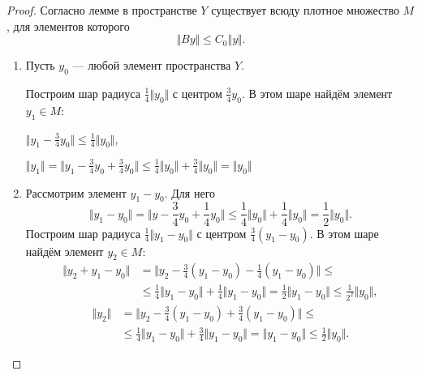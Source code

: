 \documentclass[12pt,a4paper,titlepage,oneside]{book}
\theoremstyle{definition}
\theoremstyle{plain}
\theoremstyle{break}
\theoremstyle{remark}
\theoremstyle{remark}
\theoremstyle{remark}
\theoremstyle{remark}
\theoremstyle{plain}
\theoremstyle{plain}
\begin{document}
\begin{proof}
Согласно лемме в пространстве $Y$ существует всюду плотное множество $M$, для элементов которого
$$\Vert By \Vert \leqslant C_0 \Vert y \Vert.$$
\begin{enumerate}

	\item Пусть $y_0$ --- любой элемент пространства $Y$.
	
	Построим шар радиуса $\frac{1}{4}\Vert y_0 \Vert$ с 		центром $\frac{3}{4}y_0$. В этом шаре найдём элемент
	$y_1 \in M$:
	\begin{center}
	$\Vert y_1 - \frac{3}{4}y_0\Vert \leqslant \frac{1}{4}    		\Vert y_0 \Vert $,
	\end{center}
	\begin{center}
	$\Vert y_1 \Vert =
	\Vert y_1 - \frac{3}{4}y_0 +
	\frac{3}{4}y_0 \Vert \leqslant \frac{1}{4} 			\Vert y_0 \Vert +
	 \frac{3}{4}\Vert y_0\Vert = 				\Vert y_0 \Vert$
	\end{center}
	
	\item Рассмотрим элемент $y_1 - y_0$. Для него
	$$\Vert y_1-y_0 \Vert =\Vert y - \frac{3}{4}y_0 +
	\frac{1}{4}y_0 \Vert \leqslant
	\frac{1}{4} \Vert y_0 \Vert +
	\frac{1}{4} \Vert y_0 \Vert =
	\frac{1}{2} \Vert y_0 \Vert.$$
	Построим шар радиуса $\frac{1}{4} \Vert 		y_1 - y_0 \Vert$ с центром $\frac{3}{4} (y_1 - y_0)$. В этом шаре найдём элемент $y_2 \in M$:
	\begin{align*}
	\Vert y_2 + y_1 - y_0 \Vert &= \Vert y_2 - \frac{3}{4}(y_1 - y_0) -
	\frac{1}{4}(y_1 - y_0) \Vert \leqslant \\
	&\leqslant \frac{1}{4} \Vert y_1 - y_0 \Vert + \frac{1}{4} \Vert y_1 - y_0 \Vert = \frac{1}{2} \Vert y_1 - y_0 \Vert \leqslant \frac{1}{2^2} \Vert y_0 \Vert,
	\end{align*}
	\begin{align*}
	\Vert y_2 \Vert &=
	\Vert y_2 - \frac{3}{4}(y_1 - y_0) +
	\frac{3}{4}(y_1 - y_0) \Vert \leqslant\\
	&\leqslant \frac{1}{4} \Vert y_1 - y_0 \Vert +
	\frac{3}{4} \Vert y_1 - y_0 \Vert =
	 \Vert y_1 - y_0 \Vert \leqslant \frac{1}{2} \Vert y_0 \Vert.
	\end{align*}
	

\end{enumerate}
\end{proof}
\end{document}
